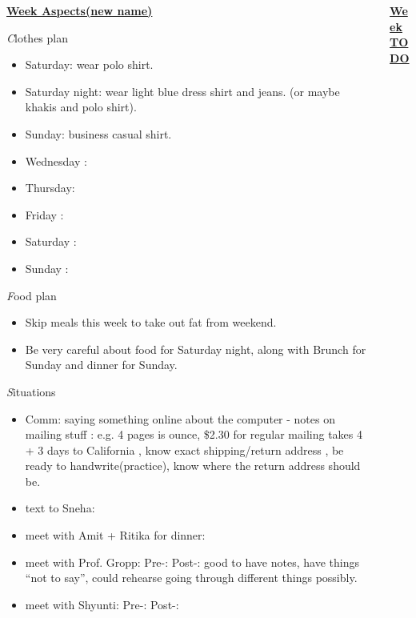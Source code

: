 \documentclass[serif,mathserif,final]{beamer}
\begin{document}
\begin{frame}{}
\begin{columns}[t]
\begin{column}{0.30\linewidth} {\textbf{\underline{Week Aspects(new name)}}}
  \begin{block}{\textit Clothes plan } 
    \begin{itemize} 
    \tiny \item \tiny Saturday: wear polo shirt. 
    \item \tiny Saturday night: wear light blue dress shirt and jeans. (or maybe khakis and polo shirt). 
    \item \tiny Sunday: business casual shirt. 
    \item \tiny Wednesday : 
    \item \tiny Thursday: 
    \item \tiny Friday : 
    \item \tiny Saturday : 
    \item \tiny Sunday : 
    \end{itemize} 
  \end{block} 

  \begin{block}{\textit Food plan } 
    \begin{itemize} 
      \small \item \tiny Skip meals this week to take out fat from weekend. 
    \item \tiny Be very careful about food for Saturday night, along with Brunch for Sunday and dinner for Sunday. 
    \end{itemize} 
  \end{block} 

  \begin{block}{\textit Situations} 
    \begin{itemize} 
 \item \tiny Comm: saying something online about the computer - 
      notes on mailing stuff : e.g. 4 pages is ounce,  \$2.30 for
      regular mailing takes 4 + 3  days to California ,  know exact
      shipping/return address ,  be ready to handwrite(practice), know
      where the return address should be.   
    \item \tiny text to Sneha:  
    \item \tiny meet with Amit + Ritika for dinner: 
    \item \tiny meet with Prof. Gropp: Pre-:  Post-: good to have
      notes, have things ``not to say'',  could rehearse going through
      different things possibly. 
    \item \tiny meet with Shyunti:  Pre-:  Post-: 
    \end{itemize}
  \end{block} 
\end{column} %
\begin{column}{0.33\linewidth}{\textbf{\underline{Week TODO}}} 


\end{column}
\end{columns}
\end{frame}
\end{document}
